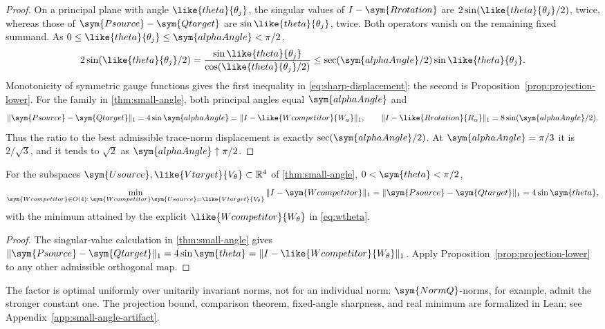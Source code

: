 \begin{proof}
On a principal plane with angle $\like{theta}{\theta_j}$, the singular values of
$I-\sym{Rrotation}$ are $2\sin(\like{theta}{\theta_j}/2)$, twice, whereas those of $\sym{Psource}-\sym{Qtarget}$ are
$\sin\like{theta}{\theta_j}$, twice. Both operators vanish on the remaining fixed
summand. As $0\leq\like{theta}{\theta_j}\leq\sym{alphaAngle}<\pi/2$,
\[
 2\sin(\like{theta}{\theta_j}/2)
 =\frac{\sin\like{theta}{\theta_j}}{\cos(\like{theta}{\theta_j}/2)}
 \leq\sec(\sym{alphaAngle}/2)\sin\like{theta}{\theta_j}.
\]
Monotonicity of symmetric gauge functions gives the first inequality in
\cref{eq:sharp-displacement}; the second is
Proposition~\ref{prop:projection-lower}. For the family in
\cref{thm:small-angle}, both principal angles equal $\sym{alphaAngle}$ and
\[
 \|\sym{Psource}-\sym{Qtarget}\|_1=4\sin\sym{alphaAngle}
 =\|I-\like{Wcompetitor}{W_\alpha}\|_1,
 \qquad \|I-\like{Rrotation}{R_\alpha}\|_1=8\sin(\sym{alphaAngle}/2).
\]
Thus the ratio to the best admissible trace-norm displacement is exactly
$\sec(\sym{alphaAngle}/2)$. At $\sym{alphaAngle}=\pi/3$ it is $2/\sqrt3$, and it tends
to $\sqrt2$ as $\sym{alphaAngle}\uparrow\pi/2$.
\end{proof}

\begin{corollary}
\label{cor:real-trace-optimum}
For the subspaces $\sym{Usource},\like{Vtarget}{V_\theta}\subset\mathbb R^4$ of
\cref{thm:small-angle}, $0<\sym{theta}<\pi/2$,
\begin{equation}
 \min_{\sym{Wcompetitor}\in O(4):\,\sym{Wcompetitor}\sym{Usource}=\like{Vtarget}{V_\theta}}\|I-\sym{Wcompetitor}\|_1
 =\|\sym{Psource}-\sym{Qtarget}\|_1=4\sin\sym{theta},
 \label{eq:real-trace-minimum}
\end{equation}
with the minimum attained by the explicit $\like{Wcompetitor}{W_\theta}$ in
\cref{eq:wtheta}.
\end{corollary}

\begin{proof}
The singular-value calculation in \cref{thm:small-angle} gives
$\|\sym{Psource}-\sym{Qtarget}\|_1=4\sin\sym{theta}=\|I-\like{Wcompetitor}{W_\theta}\|_1$.
Apply Proposition~\ref{prop:projection-lower} to any other admissible orthogonal
map.
\end{proof}

The factor is optimal uniformly over unitarily invariant norms, not for
an individual norm: $\sym{NormQ}$-norms, for example, admit the stronger constant one.
The projection bound, comparison theorem, fixed-angle sharpness, and real
minimum are formalized in Lean; see Appendix~\ref{app:small-angle-artifact}.


